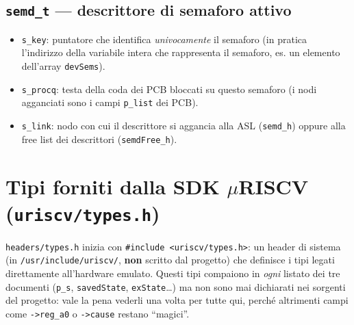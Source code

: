 \documentclass[11pt,a4paper]{article}
\newcommand{\code}[1]{\texttt{#1}}
\begin{document}
\subsection{\code{semd\_t} --- descrittore di semaforo attivo}
\begin{itemize}
\item \code{s\_key}: puntatore che identifica \emph{univocamente} il
  semaforo (in pratica l'indirizzo della variabile intera che rappresenta il
  semaforo, es. un elemento dell'array \code{devSems}).
\item \code{s\_procq}: testa della coda dei PCB bloccati su questo semaforo
  (i nodi agganciati sono i campi \code{p\_list} dei PCB).
\item \code{s\_link}: nodo con cui il descrittore si aggancia alla ASL
  (\code{semd\_h}) oppure alla free list dei descrittori
  (\code{semdFree\_h}).
\end{itemize}

\section{Tipi forniti dalla SDK \texorpdfstring{$\mu$}{u}RISCV (\code{uriscv/types.h})}

\code{headers/types.h} inizia con \code{\#include <uriscv/types.h>}: un
header di sistema (in \code{/usr/include/uriscv/}, \textbf{non} scritto dal
progetto) che definisce i tipi legati direttamente all'hardware emulato.
Questi tipi compaiono in \emph{ogni} listato dei tre documenti (\code{p\_s},
\code{savedState}, \code{exState}\ldots) ma non sono mai dichiarati nei
sorgenti del progetto: vale la pena vederli una volta per tutte qui, perché
altrimenti campi come \code{->reg\_a0} o \code{->cause} restano ``magici''.
\end{document}
